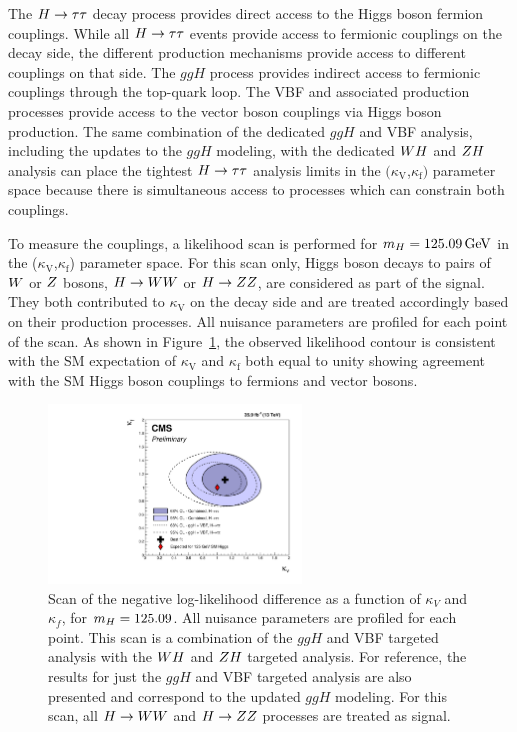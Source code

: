 The $H\to\tau\tau$ decay process
provides direct access to the Higgs boson fermion couplings. While all
$H\to\tau\tau$ events provide access to fermionic couplings on the decay side,
the different production mechanisms provide access to different couplings on that side.
The $ggH$ process provides indirect access to fermionic couplings through
the top-quark loop. The VBF and associated production processes provide access to the
vector boson couplings via Higgs boson production.
The same combination of the dedicated $ggH$ and VBF analysis, including
the updates to the $ggH$ modeling, with
the dedicated $WH$ and $ZH$ analysis can place the tightest
$H\to\tau\tau$ analysis limits in the $(\kappa_\text{V}$,$\kappa_\text{f})$ parameter space
because there is simultaneous access to processes which can constrain both
couplings.

To measure the couplings, a likelihood scan is performed for $m_{H}=125.09\,\mathrm{GeV}$ in 
the ($\kappa_\text{V}$,$\kappa_\text{f}$) parameter space.
For this scan only, Higgs boson decays to pairs of $W$ or $Z$ bosons, $H\to WW$ or $H\to ZZ$,
are considered as part of the signal. They both contributed to $\kappa_\text{V}$ on the
decay side and are treated accordingly based on their production processes.
All nuisance 
parameters are profiled for each point of the scan. As shown in 
Figure~\ref{fig:cmb_kFkV}, the observed likelihood contour is consistent with the SM expectation 
of $\kappa_\text{V}$ and $\kappa_\text{f}$ both equal to unity showing
agreement with the SM Higgs boson couplings to fermions and vector bosons.

\begin{figure}[!ht]
 \begin{center}
  \includegraphics[width=0.60\textwidth]{higgs_to_taus_vh/plots/combined/kFkV_HIG-18-007_plus_HIG-16-043_comp_up.pdf}
 \end{center}
 \caption{Scan of the negative 
 log-likelihood difference as a function of $\kappa_V$ and $\kappa_f$, for 
 $m_{H} = 125.09$\GeV.  All nuisance parameters are profiled for each point. 
 This scan is a combination of the $ggH$ and VBF targeted analysis with the 
 $WH$ and $ZH$ targeted analysis. For reference, the results for just
 the $ggH$ and VBF targeted analysis are also presented and correspond
 to the updated $ggH$ modeling.
 For this scan, all $H\to WW$ and $H\to ZZ$ processes 
 are treated as signal.
 }
 \label{fig:cmb_kFkV}
\end{figure}



\clearpage
